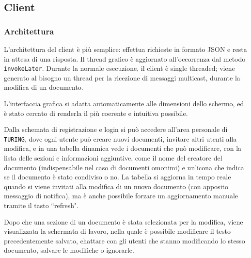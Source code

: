 \subsection{Client}

\subsubsection{Architettura}
L'architettura del client è più semplice: effettua richieste in formato JSON e resta in attesa di una risposta. Il thread grafico è aggiornato all'occorrenza dal metodo \texttt{invokeLater}. Durante la normale esecuzione, il client è single threaded; viene generato al bisogno un thread per la ricezione di messaggi multicast, durante la modifica di un documento.

\medskip

L'interfaccia grafica si adatta automaticamente alle dimensioni dello scher\-mo, ed è stato cercato di renderla il più coerente e intuitiva possibile.

\medskip

Dalla schemata di registrazione e login si può accedere all'area personale di \texttt{TURING}, dove ogni utente può creare nuovi documenti, invitare altri utenti alla modifica, e in una tabella dinamica vede i documenti che può modificare, con la lista delle sezioni e informazioni aggiuntive, come il nome del creatore del documento (indispensabile nel caso di documenti omonimi) e un'icona che indica se il documento è stato condiviso o no. La tabella si aggiorna in tempo reale quando si viene invitati alla modifica di un nuovo documento (con apposito messaggio di notifica), ma è anche possibile forzare un aggiornamento manuale tramite il tasto ``refresh".

\medskip

Dopo che una sezione di un documento è stata selezionata per la modifica, viene visualizzata la schermata di lavoro, nella quale è possibile modificare il testo precedentemente salvato, chattare con gli utenti che stanno modificando lo stesso documento, salvare le modifiche o ignorarle.

